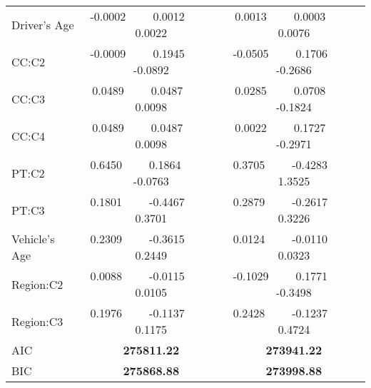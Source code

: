 \documentclass[12pt]{article}%
\theoremstyle{definition}
\theoremstyle{remark}
\begin{document}
{\begin{table}[H]
\begin{center}
{\begin{tabular}{l|c|c}
		Driver's Age & -0.0002$\hspace{1cm}$0.0012$\hspace{1cm}$0.0022  &0.0013$\hspace{1cm}$0.0003$\hspace{1cm}$0.0076 \\
		CC:C2 & -0.0009$\hspace{1cm}$0.1945$\hspace{1cm}$-0.0892 &-0.0505$\hspace{1cm}$0.1706$\hspace{1cm}$-0.2686\\
		CC:C3 &0.0489$\hspace{1cm}$0.0487$\hspace{1cm}$ 0.0098 &0.0285$\hspace{1cm}$0.0708$\hspace{1cm}$-0.1824 \\
    	CC:C4 &0.0489$\hspace{1cm}$0.0487$\hspace{1cm}$ 0.0098 &0.0022$\hspace{1cm}$0.1727$\hspace{1cm}$-0.2971 \\
		PT:C2 &0.6450$\hspace{1cm}$0.1864 $\hspace{1cm}$-0.0763 &0.3705$\hspace{1cm}$-0.4283$\hspace{1cm}$1.3525\\
		PT:C3 &0.1801$\hspace{1cm}$-0.4467$\hspace{1cm}$0.3701  &0.2879$\hspace{1cm}$-0.2617$\hspace{1cm}$0.3226 \\
		Vehicle's Age& 0.2309$\hspace{1cm}$-0.3615$\hspace{1cm}$0.2449 & 0.0124$\hspace{1cm}$-0.0110$\hspace{1cm}$0.0323\\
		Region:C2 &0.0088$\hspace{1cm}$-0.0115$\hspace{1cm}$ 0.0105 &-0.1029$\hspace{1cm}$0.1771$\hspace{1cm}$-0.3498 \\
		Region:C3 & 0.1976$\hspace{1cm}$-0.1137$\hspace{1cm}$0.1175 &0.2428$\hspace{1cm}$-0.1237$\hspace{1cm}$0.4724 \\
		\hline
		AIC& \textbf{275811.22}& \textbf{273941.22} \\
		BIC&\textbf{275868.88} & \textbf{273998.88}\\
		\hline \hline
	\end{tabular}}
\end{center}
\end{table}
\vspace{1cm}
\pagebreak

}
\end{document}
